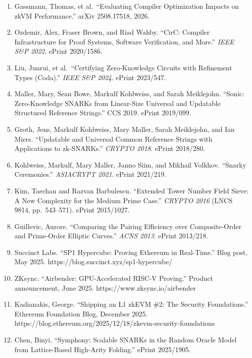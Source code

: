 \documentclass[
  11pt,
  openany]{report}
\providecommand{\tightlist}{%
  \setlength{\itemsep}{0pt}\setlength{\parskip}{0pt}}
\begin{document}
\begin{enumerate}
\def\labelenumi{\arabic{enumi}.}
\setcounter{enumi}{31}
\tightlist
\item
  Gassmann, Thomas, et al.~``Evaluating Compiler Optimization Impacts on zkVM
  Performance.'' arXiv 2508.17518, 2026.
\item
  Ozdemir, Alex, Fraser Brown, and Riad Wahby. ``CirC: Compiler Infrastructure
  for Proof Systems, Software Verification, and More.'' \emph{IEEE S\&P 2022}.
  ePrint 2020/1586.
\item
  Liu, Junrui, et al.~``Certifying Zero-Knowledge Circuits with Refinement Types
  (Coda).'' \emph{IEEE S\&P 2024}. ePrint 2023/547.
\item
  Maller, Mary, Sean Bowe, Markulf Kohlweiss, and Sarah Meiklejohn. ``Sonic:
  Zero-Knowledge SNARKs from Linear-Size Universal and Updatable Structured
  Reference Strings.'' CCS 2019. ePrint 2019/099.
\item
  Groth, Jens, Markulf Kohlweiss, Mary Maller, Sarah Meiklejohn, and Ian Miers.
  ``Updatable and Universal Common Reference Strings with Applications to
  zk-SNARKs.'' \emph{CRYPTO 2018}. ePrint 2018/280.
\item
  Kohlweiss, Markulf, Mary Maller, Janno Siim, and Mikhail Volkhov. ``Snarky
  Ceremonies.'' \emph{ASIACRYPT 2021}. ePrint 2021/219.
\item
  Kim, Taechan and Razvan Barbulescu. ``Extended Tower Number Field Sieve: A New
  Complexity for the Medium Prime Case.'' \emph{CRYPTO 2016} (LNCS 9814,
  pp.~543--571). ePrint 2015/1027.
\item
  Guillevic, Aurore. ``Comparing the Pairing Efficiency over Composite-Order and
  Prime-Order Elliptic Curves.'' \emph{ACNS 2013}. ePrint 2013/218.
\item
  Succinct Labs. ``SP1 Hypercube: Proving Ethereum in Real-Time.'' Blog post,
  May 2025. https://blog.succinct.xyz/sp1-hypercube/
\item
  ZKsync. ``Airbender: GPU-Accelerated RISC-V Proving.'' Product announcement,
  June 2025. https://www.zksync.io/airbender
\item
  Kadianakis, George. ``Shipping an L1 zkEVM \#2: The Security Foundations.''
  Ethereum Foundation Blog, December 2025.
  https://blog.ethereum.org/2025/12/18/zkevm-security-foundations
\item
  Chen, Binyi. ``Symphony: Scalable SNARKs in the Random Oracle Model from
  Lattice-Based High-Arity Folding.'' ePrint 2025/1905.
\end{enumerate}
\end{document}
